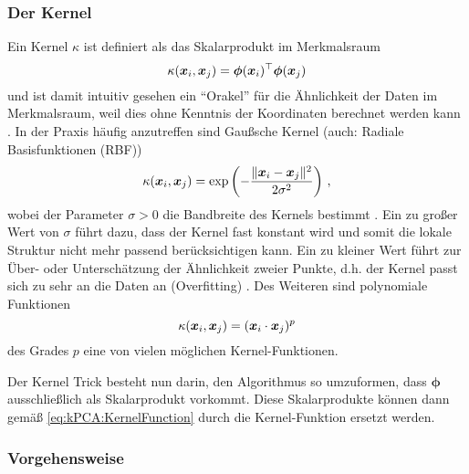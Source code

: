 \subsubsection{Der Kernel}
\label{ch:MethodenDerDimRed:statistisch:kPCA:KernelFunktion}

Ein Kernel $\kappa$ ist definiert als das Skalarprodukt im Merkmalsraum \parencite[34]{ShaweTaylor.2011}
\begin{equation}
	\label{eq:kPCA:KernelFunction}
	\kappa(\bm{x}_i, \bm{x}_j) = \bm{\phi}(\bm{x}_i)^\top \bm{\phi}(\bm{x}_j)
\end{equation}
und ist damit intuitiv gesehen ein \enquote{Orakel} für die Ähnlichkeit der Daten im Merkmalsraum, weil dies ohne Kenntnis der Koordinaten berechnet werden kann \parencite[71]{ShaweTaylor.2011}. In der Praxis häufig anzutreffen sind Gaußsche Kernel (auch: Radiale
Basisfunktionen (RBF))
\begin{equation}
	\kappa(\bm{x}_i, \bm{x}_j) = \exp \left(- \frac{\lVert \bm{x}_i - \bm{x}_j\rVert^2}{2\sigma^2}\right) \, ,
\end{equation}
wobei der Parameter $\sigma > 0$ die Bandbreite des Kernels bestimmt \parencite[296]{ShaweTaylor.2011}. Ein zu großer Wert von $\sigma$ führt dazu, dass der Kernel fast
konstant wird und somit die lokale Struktur nicht mehr passend berücksichtigen kann. Ein zu kleiner
Wert führt zur Über- oder Unterschätzung der Ähnlichkeit zweier Punkte, d.h. der Kernel passt sich
zu sehr an die Daten an (Overfitting) \parencite[296 -- 297]{ShaweTaylor.2011}. Des Weiteren sind polynomiale Funktionen \parencite[292]{ShaweTaylor.2011}
\begin{equation}
	\kappa(\bm{x}_i, \bm{x}_j) = (\bm{x}_i \cdot \bm{x}_j)^p
\end{equation}
des Grades $p$ eine von vielen möglichen Kernel-Funktionen.

Der Kernel Trick besteht nun darin, den Algorithmus so umzuformen, dass $\bm{\phi}$ ausschließlich
als Skalarprodukt vorkommt. Diese Skalarprodukte können dann gemäß \eqref{eq:kPCA:KernelFunction}
durch die Kernel-Funktion ersetzt werden.

\subsubsection{Vorgehensweise}
\label{ch:MethodenDerDimRed:statistisch:kPCA:Vorgehensweise}

